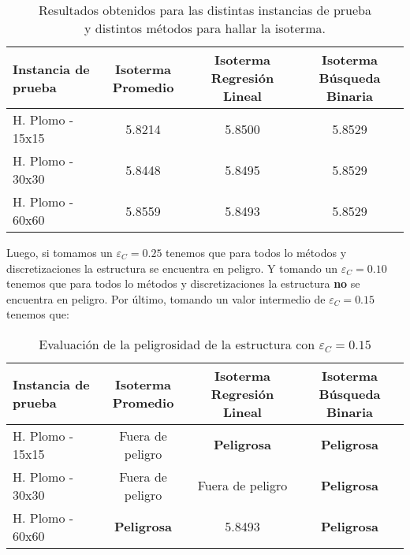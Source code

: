 \begin{table}[H]
    \begin{center}
        \begin{tabular}{| l | c | c | c |}
            \hline
            Instancia de prueba & Isoterma Promedio & Isoterma Regresión Lineal & Isoterma Búsqueda Binaria \\ \hline
            H. Plomo - 15x15    & 5.8214            & 5.8500                    & 5.8529                    \\
            H. Plomo - 30x30    & 5.8448            & 5.8495                    & 5.8529                    \\
            H. Plomo - 60x60    & 5.8559            & 5.8493                    & 5.8529                    \\
            \hline
        \end{tabular}
        \captionsetup{justification=centering}
        \caption{Resultados obtenidos para las distintas instancias de prueba\\ y distintos métodos para hallar la isoterma.}
    \end{center}
\end{table}

Luego, si tomamos un $\varepsilon_C = 0.25$ tenemos que para todos lo métodos y discretizaciones la estructura se encuentra en peligro.
Y tomando un $\varepsilon_C = 0.10$ tenemos que para todos lo métodos y discretizaciones la estructura \textbf{no} se encuentra en peligro.
Por último, tomando un valor intermedio de $\varepsilon_C = 0.15$ tenemos que:

\begin{table}[H]
    \begin{center}
        \begin{tabular}{| l | c | c | c |}
            \hline
            Instancia de prueba & Isoterma Promedio  & Isoterma Regresión Lineal & Isoterma Búsqueda Binaria \\ \hline
            H. Plomo - 15x15    & Fuera de peligro   & \textbf{Peligrosa}        & \textbf{Peligrosa}        \\
            H. Plomo - 30x30    & Fuera de peligro   & Fuera de peligro          & \textbf{Peligrosa}        \\
            H. Plomo - 60x60    & \textbf{Peligrosa} & 5.8493                    & \textbf{Peligrosa}        \\
            \hline
        \end{tabular}
        \captionsetup{justification=centering}
        \caption{Evaluación de la peligrosidad de la estructura con $\varepsilon_C = 0.15$}
    \end{center}
\end{table}

